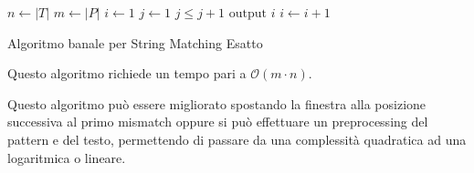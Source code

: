 \begin{algorithm}
    \begin{algorithmic}
        \State $n\gets |T|$
        \State $m \gets |P|$
        \State $i\gets 1$
        \State $j \gets 1$
        \State $j \leq j + 1$
        \EndWhile
        \State $\text{output } i$
        \EndIf
        \State $i \gets i + 1$
        \EndWhile
        \EndFunction
    \end{algorithmic}
    \caption{Algoritmo banale per String Matching Esatto}
\end{algorithm}
Questo algoritmo richiede un tempo pari a $\mathcal{O}(m \cdot n)$.
\begin{nota}
    Questo algoritmo può essere migliorato spostando la finestra alla posizione
    successiva al primo mismatch oppure si può effettuare un preprocessing del
    pattern e del testo, permettendo di passare da una complessità quadratica ad
    una logaritmica o lineare.
\end{nota}
